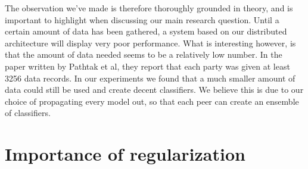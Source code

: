 The observation we've made is therefore thoroughly grounded in theory, and is important to highlight when discussing our main research question. Until a certain amount of data has been gathered, a system based on our distributed architecture will display very poor performance. What is interesting however, is that the amount of data needed seems to be a relatively low number. In the paper written by Pathtak et al\cite{pathak2010diffprivhomo}, they report that each party was given at least 3256 data records. In our experiments we found that a much smaller amount of data could still be used and create decent classifiers. We believe this is due to our choice of propagating every model out, so that each peer can create an ensemble of classifiers. 

\section{Importance of regularization}


